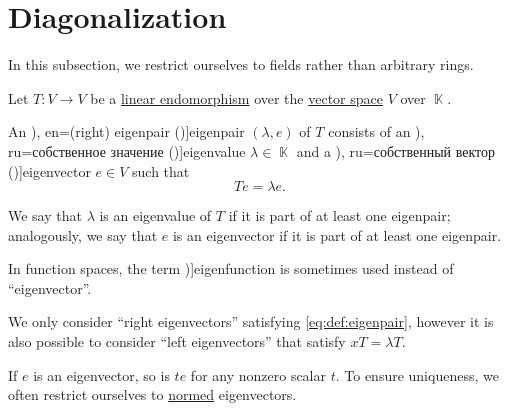 \section{Diagonalization}\label{sec:diagonalization}

In this subsection, we restrict ourselves to fields rather than arbitrary rings.

\begin{definition}\label{def:eigenpair}
  Let \( T: V \to V \) be a \hyperref[def:linear_function]{linear endomorphism} over the \hyperref[def:vector_space]{vector space} \( V \) over \( \BbbK \).

  An \term[ru=собственная пара (\cite[\S 29.2]{Тыртышников2007ЛинейнаяАлгебра}), en=(right) eigenpair (\cite[def. 1.1]{Stewart2001MatrixAlgorithmsVol2})]{eigenpair} \( (\lambda, e) \) of \( T \) consists of an \term[bg=собствена стойност (\cite[256]{ГеновМиховскиМоллов1991Алгебра}), ru=собственное значение (\cite[\S 29.2]{Тыртышников2007ЛинейнаяАлгебра})]{eigenvalue} \( \lambda \in \BbbK \) and a  \term[bg=собствен вектор (\cite[256]{ГеновМиховскиМоллов1991Алгебра}), ru=собственный вектор (\cite[\S 29.2]{Тыртышников2007ЛинейнаяАлгебра})]{eigenvector} \( e \in V \) such that
  \begin{equation}\label{eq:def:eigenpair}
    Te = \lambda e.
  \end{equation}

  We say that \( \lambda \) is an eigenvalue of \( T \) if it is part of at least one eigenpair; analogously, we say that \( e \) is an eigenvector if it is part of at least one eigenpair.

  In function spaces, the term \term[en=eigenfunction (\cite[169]{Evans2010PDE})]{eigenfunction} is sometimes used instead of \enquote{eigenvector}.
\end{definition}
\begin{comments}
  \item We only consider \enquote{right eigenvectors} satisfying \eqref{eq:def:eigenpair}, however it is also possible to consider \enquote{left eigenvectors} that satisfy \( x T = \lambda T \).

  \item If \( e \) is an eigenvector, so is \( te \) for any nonzero scalar \( t \). To ensure uniqueness, we often restrict ourselves to \hyperref[def:normed_vector]{normed} eigenvectors.
\end{comments}

